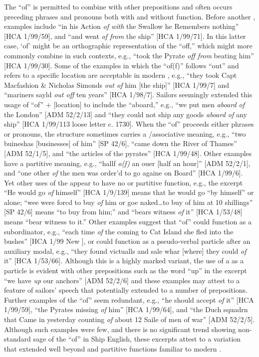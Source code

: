 The  “of” is permitted to combine with other prepositions and often occurs preceding  phrases and pronouns both with and without  function. Before another , examples include “in his Action \textit{of with} the Swallow he Remembers nothing” [HCA 1/99/59], and “and went \textit{of from} the ship” [HCA 1/99/71].  In this latter case, ‘of’ might be an orthographic representation of the  “off,” which might more commonly combine in such contexts, e.g., “took the Pyrate \textit{off from} beating him” [HCA 1/99/30]. Some of the examples in which the  “of(f)” follows “out” and refers to a specific location are acceptable in modern , e.g., “they took Capt Macfashion \& Nicholas Simonds \textit{out of} him [the ship]” [HCA 1/99/7] and “mariners sayld \textit{out off}  ten years” [HCA 1/98/7]. Sailors seemingly extended this usage of “of” + [location] to include the  “aboard,” e.g., “we put men \textit{aboard of} the London” [ADM 52/2/13] and “they could not ship any goods \textit{aboard of} any ship” [HCA 1/99/113 loose letter c. 1730]. When the  “of” proceeds either  phrases or pronouns, the structure sometimes carries a /associative meaning, e.g., “two buineshas [businesses] of him” [SP 42/6], “came down the River of Thames” [ADM 52/1/5], and “the articles of the pyrates” [HCA 1/99/48]. Other examples have a partitive meaning, e.g., “hallf \textit{o(f)} an ouer [half an hour]” [ADM 52/2/1], and “one other \textit{of} the men was order’d to go againe on Board” [HCA 1/99/6]. Yet other uses of the  appear to have no  or partitive function, e.g., the excerpt “He would go \textit{of} himself” [HCA 1/9/139] means that he would go “by himself” or alone; “wee were forcd to buy \textit{of} him or goe naked…to buy of him at 10 shillings” [SP 42/6] means “to buy from him;” and “bears witness \textit{of} it” [HCA 1/53/48] means “bear witness to it.” Other examples suggest that “of” could function as a subordinator, e.g., “each time \textit{of} the  coming to Cat Island she fled into the bushes” [HCA 1/99 New \citealt{Providence1722}], or could function as a pseudo-verbal particle after an auxiliary modal, e.g., “they found victualls and sale whar [where] they could \textit{of} it” [HCA 1/53/66]. Although this is a highly marked variant, the use of a  as a  particle is evident with other prepositions such as the word “up” in the excerpt “we have \textit{up} our anchors” [ADM 52/2/6] and these examples may attest to a feature of sailors’ speech that potentially extended to a number of prepositions. Further examples of the  “of” seem redundant, e.g., “he should accept \textit{of} it” [HCA 1/99/59], “the Pyrates missing \textit{of} him” [HCA 1/99/64], and “the Duch squadrn that Came in yesterday counting \textit{of} about 12 Saile of men of war” [ADM 52/2/5]. Although such examples were few, and there is no significant trend showing non-standard sage of the  “of” in Ship English, these excerpts attest to a variation that extended well beyond  and partitive functions familiar to modern . 

